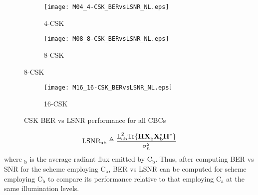 \begin{figure}[!t]
	\centering
		\begin{subfigure}{\textwidth}
		\centering
			\texttt{[image: M04\_4-CSK\_BERvsLSNR\_NL.eps]}
			\caption{4-CSK}
			\label{fig4LSNR}
		\end{subfigure}
		\begin{subfigure}{\textwidth}
		\centering
			\texttt{[image: M08\_8-CSK\_BERvsLSNR\_NL.eps]}
			\caption{8-CSK}
			\label{fig8LSNR}
		\end{subfigure}
\end{figure}
\begin{figure}[!t]
	\ContinuedFloat
		\begin{subfigure}{\textwidth}
		\centering
			\texttt{[image: M16\_16-CSK\_BERvsLSNR\_NL.eps]}
			\caption{16-CSK}
			\label{fig16LSNR}
		\end{subfigure}
	\caption{CSK BER vs LSNR performance for all CBCs}
	\label{figBERvsLSNR}
\end{figure}


\begin{equation}
	\text{LSNR}_{\text{ab}} \triangleq \frac{\text{L}^{2}_{\text{ab}}\text{Tr}\{{\bf{H}}{\bf{X}}^{ }_{\text{b}}{\bf{X}}^{*}_{\text{b}}{\bf{H}}^{*}\}}{\sigma^{2}_{n}} 
	\label{eqLSNR}
\end{equation}
where $_{\text{b}}$ is the average radiant flux emitted by C$_{\text{b}}$. Thus, after computing BER vs SNR for the scheme employing C$_{\text{a}}$, BER vs LSNR can be computed for scheme employing C$_{\text{b}}$ to compare its performance relative to that employing C$_{\text{a}}$ at the same illumination levels.


